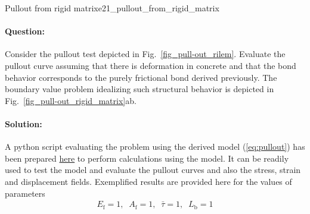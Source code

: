 \documentclass[main.tex]{subfiles}
\begin{document}
\begin{bmcsex}{Pullout from rigid matrix}{e21_pullout_from_rigid_matrix}
\paragraph{Question:} Consider the pullout test depicted in Fig.~\ref{fig_pull-out_rilem}.
Evaluate the pullout curve assuming that there is deformation in concrete
and that the bond behavior corresponds to the purely frictional bond
derived previously. The boundary value problem idealizing such structural
behavior is depicted in Fig.~\ref{fig_pull-out_rigid_matrix}ab.

\paragraph{Solution:} 
A python script evaluating the problem using the derived model (\ref{eq:pullout}) 
has been prepared \href{http://localhost:8888/tree/Examples/2_1_pullout_from_rigid_matrix.ipynb}{here}
to perform calculations using the model. It can be readily used to test the model and evaluate the pullout curves and also the stress, strain and displacement fields.
Exemplified results are provided here for the values of parameters
\begin{align}
    E_\mathrm{f} = 1, \;\; 
    A_\mathrm{f} = 1, \;\;
    \bar{\tau} = 1, \;\;
    L_\mathrm{b} = 1
\end{align}

\end{bmcsex}
\end{document}
